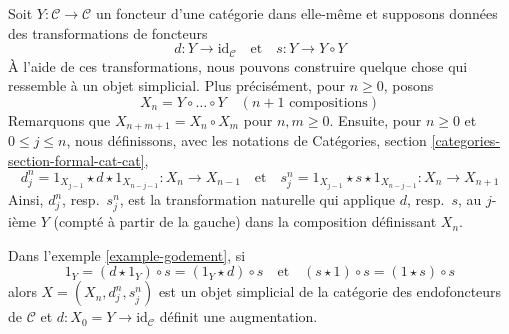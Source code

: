 \begin{example}
\label{example-godement}
Soit $Y : \mathcal{C} \to \mathcal{C}$ un foncteur d'une catégorie dans
elle-même et supposons données des transformations de foncteurs
$$
d : Y \longrightarrow \text{id}_\mathcal{C}
\quad\text{et}\quad
s : Y \longrightarrow Y \circ Y
$$
À l'aide de ces transformations, nous pouvons construire quelque chose qui
ressemble à un objet simplicial. Plus précisément, pour $n \geq 0$, posons
$$
X_n = Y \circ \ldots \circ Y \quad (n + 1\text{ compositions})
$$
Remarquons que $X_{n + m + 1} = X_n \circ X_m$ pour $n, m \geq 0$.
Ensuite, pour $n \geq 0$ et $0 \leq j \leq n$, nous définissons, avec les
notations de Catégories, section \ref{categories-section-formal-cat-cat},
$$
d^n_j = 1_{X_{j - 1}} \star d \star 1_{X_{n - j - 1}} :
X_n
\to
X_{n - 1}
\quad\text{et}\quad
s^n_j = 1_{X_{j - 1}} \star s \star 1_{X_{n - j - 1}} :
X_n
\to
X_{n + 1}
$$
Ainsi, $d^n_j$, resp.\ $s^n_j$, est la transformation naturelle qui applique
$d$, resp.\ $s$, au $j$-ième $Y$ (compté à partir de la gauche) dans la
composition définissant $X_n$.
\end{example}

\begin{lemma}
\label{lemma-godement}
Dans l'exemple \ref{example-godement}, si
$$
1_Y = (d \star 1_Y) \circ s = (1_Y \star d) \circ s
\quad\text{et}\quad
(s \star 1) \circ s = (1 \star s) \circ s
$$
alors $X = (X_n, d^n_j, s^n_j)$ est un objet simplicial de la catégorie
des endofoncteurs de $\mathcal{C}$ et $d : X_0 = Y \to \text{id}_\mathcal{C}$
définit une augmentation.
\end{lemma}

